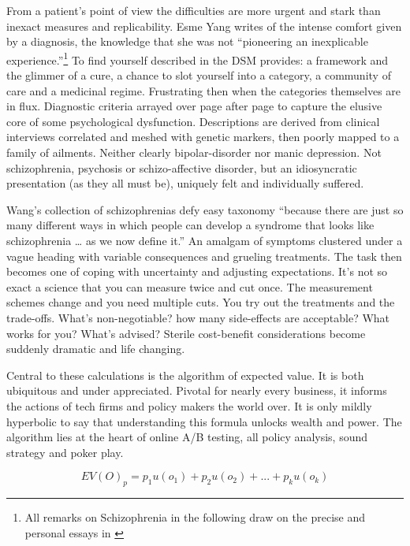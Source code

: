 \documentclass[]{tufte-book}
\theoremstyle{definition}
\theoremstyle{definition}
\theoremstyle{definition}
\theoremstyle{remark}
\begin{document}
From a patient's point of view the difficulties are more urgent and stark than inexact measures and replicability. Esme Yang writes of the intense comfort given by a diagnosis, the knowledge that she was not ``pioneering an inexplicable experience.''\footnote{All remarks on Schizophrenia in the following draw on the precise and personal essays in \citep{WangSchizophrenia}} To find yourself described in the DSM provides: a framework and the glimmer of a cure, a chance to slot yourself into a category, a community of care and a medicinal regime. Frustrating then when the categories themselves are in flux. Diagnostic criteria arrayed over page after page to capture the elusive core of some psychological dysfunction. Descriptions are derived from clinical interviews correlated and meshed with genetic markers, then poorly mapped to a family of ailments. Neither clearly bipolar-disorder nor manic depression. Not schizophrenia, psychosis or schizo-affective disorder, but an idiosyncratic presentation (as they all must be), uniquely felt and individually suffered.

Wang's collection of schizophrenias defy easy taxonomy ``because there are just so many different ways in which people can develop a syndrome that looks like schizophrenia \ldots{} as we now define it.'' An amalgam of symptoms clustered under a vague heading with variable consequences and grueling treatments. The task then becomes one of coping with uncertainty and adjusting expectations. It's not so exact a science that you can measure twice and cut once. The measurement schemes change and you need multiple cuts. You try out the treatments and the trade-offs. What's non-negotiable? how many side-effects are acceptable? What works for you? What's advised? Sterile cost-benefit considerations become suddenly dramatic and life changing.

Central to these calculations is the algorithm of expected value. It is both ubiquitous and under appreciated. Pivotal for nearly every business, it informs the actions of tech firms and policy makers the world over. It is only mildly hyperbolic to say that understanding this formula unlocks wealth and power. The algorithm lies at the heart of online A/B testing, all policy analysis, sound strategy and poker play.

\[ EV(O)_{p} = p_{1}u(o_{1}) + p_{2}u(o_{2}) + ... + p_{k}u(o_{k}) \]
\end{document}
